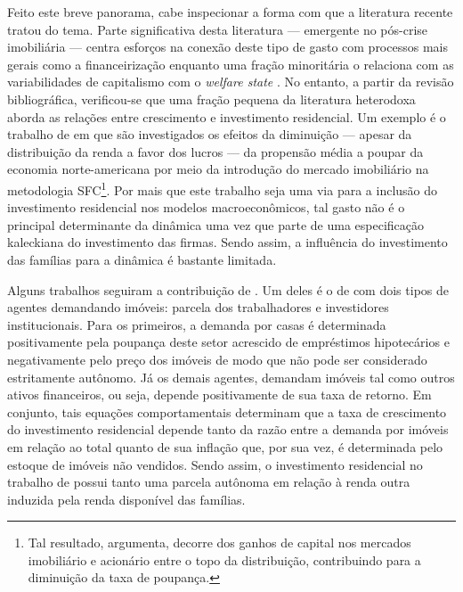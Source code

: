 Feito este breve panorama, cabe inspecionar a forma com que a literatura recente tratou do tema. 
Parte significativa desta literatura  --- emergente no pós-crise imobiliária --- centra esforços na conexão deste tipo de gasto com processos mais gerais como a financeirização \cites{aalbers_financialization_2008}{bibow_financialization_2010}
enquanto uma fração minoritária o relaciona com as variabilidades
de capitalismo com o \textit{welfare state} \cite{schwartz_politics_2009}. No
entanto, a partir da revisão bibliográfica, verificou-se que uma fração pequena da literatura heterodoxa aborda as relações entre crescimento e investimento residencial.
Um  exemplo é o trabalho de \textcite{zezza_u.s._2008} em que são investigados os efeitos da diminuição --- apesar da distribuição da renda a favor dos lucros --- da propensão média a poupar da economia norte-americana por meio da introdução do mercado imobiliário na metodologia SFC\footnote{
	Tal resultado, argumenta, decorre dos ganhos de capital nos mercados imobiliário e acionário entre o topo da distribuição, contribuindo para a diminuição da taxa de poupança.
}. 
Por mais que este trabalho seja uma via para a inclusão do investimento residencial nos modelos macroeconômicos, tal gasto não é o principal determinante da dinâmica  uma vez que parte de uma especificação kaleckiana do investimento das firmas.
Sendo assim, a influência do investimento das famílias para a dinâmica é bastante limitada.


Alguns trabalhos seguiram a contribuição de \textcite{zezza_u.s._2008}.
Um deles é o de \textcite{nikolaidi_securitisation_2015} com dois tipos de agentes demandando imóveis: parcela dos trabalhadores e investidores institucionais.
Para os primeiros, a demanda por casas é determinada positivamente pela poupança deste setor acrescido de empréstimos hipotecários e negativamente pelo preço dos imóveis de modo que não pode ser considerado estritamente autônomo.
Já os demais agentes, demandam imóveis tal como outros ativos financeiros, ou seja, depende positivamente de sua taxa de retorno.
Em conjunto, tais equações comportamentais determinam que a taxa de crescimento do investimento residencial depende tanto da razão entre a demanda por imóveis em relação ao total quanto de sua inflação que, por sua vez, é determinada pelo estoque de imóveis não vendidos.
Sendo assim, o investimento residencial no trabalho de \textcite{nikolaidi_securitisation_2015} possui tanto uma parcela autônoma em relação à renda outra induzida pela renda disponível das famílias.

